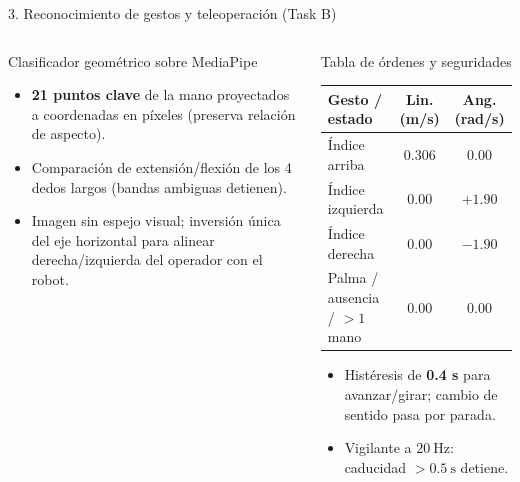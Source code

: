 \documentclass[aspectratio=169,10pt]{beamer}
\begin{document}
\begin{frame}{3. Reconocimiento de gestos y teleoperación (Task B)}
  \small
  \begin{columns}[T,onlytextwidth]
    \begin{block}{Clasificador geométrico sobre MediaPipe}
      \begin{itemize}
        \item \textbf{21 puntos clave} de la mano proyectados a coordenadas en píxeles (preserva relación de aspecto).
        \item Comparación de extensión/flexión de los 4 dedos largos (bandas ambiguas detienen).
        \item Imagen sin espejo visual; inversión única del eje horizontal para alinear derecha/izquierda del operador con el robot.
      \end{itemize}
    \end{block}

    \begin{block}{Tabla de órdenes y seguridades}
      \footnotesize
      \begin{tabularx}{\textwidth}{@{}Ycc@{}}
        \hline
        \textbf{Gesto / estado} & \textbf{Lin. (m/s)} & \textbf{Ang. (rad/s)}\\
        \hline
        Índice arriba & $0.306$ & $0.00$\\
        Índice izquierda & $0.00$ & $+1.90$\\
        Índice derecha & $0.00$ & $-1.90$\\
        Palma / ausencia / $>1$ mano & $0.00$ & $0.00$\\
        \hline
      \end{tabularx}
      \vspace{0.3em}
      \begin{itemize}
        \item Histéresis de \textbf{0.4 s} para avanzar/girar; cambio de sentido pasa por parada.
        \item Vigilante a $20\ \mathrm{Hz}$: caducidad $>0.5\ \mathrm{s}$ detiene.
      \end{itemize}
    \end{block}
  \end{columns}
\end{frame}
\end{document}
